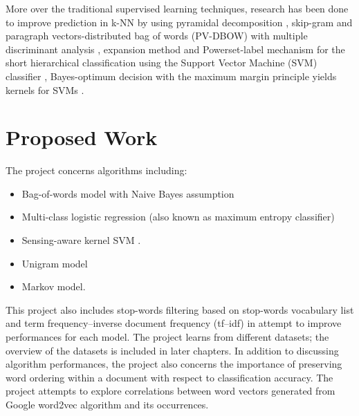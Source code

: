 \documentclass[a4paper, 11pt]{article}
\begin{document}
More over the traditional supervised learning techniques, research has been done to improve prediction in k-NN by using pyramidal decomposition \cite{heroux1998classification},  skip-gram and paragraph vectors-distributed bag of words (PV-DBOW) with multiple discriminant analysis \cite{lauren2018discriminant}, expansion method and Powerset-label mechanism for the short hierarchical classification using the Support Vector Machine (SVM) classifier \cite{salih2018term}, Bayes-optimum decision with the maximum margin principle yields kernels for SVMs \cite{ding2014sensing}.



\section{Proposed Work}
The project concerns algorithms including:
\begin{itemize}
\item Bag-of-words model with Naive Bayes assumption
\item Multi-class logistic regression (also known as maximum entropy classifier)
\item Sensing-aware kernel SVM \cite{ding2014sensing}.
\item Unigram model
\item Markov model.
\end{itemize}
 This project also includes stop-words filtering based on stop-words vocabulary list and term frequency–inverse document frequency (tf–idf) in attempt to improve performances for each model. The project learns from different datasets; the overview of the datasets is included in later chapters. In addition to discussing algorithm performances, the project also concerns the importance of preserving word ordering within a document with respect to classification accuracy. The project attempts to explore correlations between word vectors generated from Google word2vec algorithm and its occurrences. 
\end{document}
